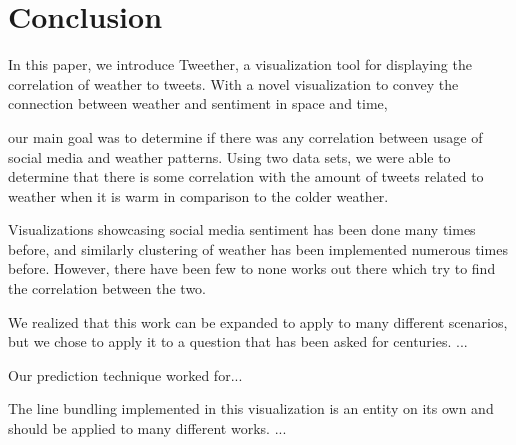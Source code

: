 \section{Conclusion}

In this paper, we introduce Tweether, a visualization tool for displaying the correlation of weather to tweets. With a novel visualization to convey the connection between weather and sentiment in space and time, 


our main goal was to determine if there was any correlation between usage of social media and weather patterns. Using two data sets, we were able to determine that there is some correlation with the amount of tweets related to weather when it is warm in comparison to the colder weather.

Visualizations showcasing social media sentiment has been done many times before, and similarly clustering of weather has been implemented numerous times before. However, there have been few to none works out there which try to find the correlation between the two.

We realized that this work can be expanded to apply to many different scenarios, but we chose to apply it to a question that has been asked for centuries. ...

Our prediction technique worked for...

The line bundling implemented in this visualization is an entity on its own and should be applied to many different works. ... 